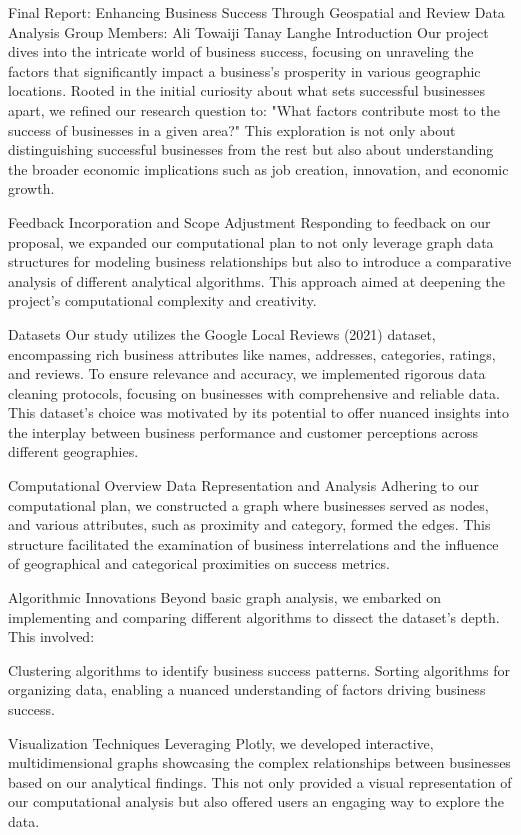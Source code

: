 Final Report: Enhancing Business Success Through Geospatial and Review Data Analysis
Group Members:
Ali Towaiji
Tanay Langhe
Introduction
Our project dives into the intricate world of business success, focusing on unraveling the factors that significantly
impact a business's prosperity in various geographic locations. Rooted in the initial curiosity about what sets
successful businesses apart, we refined our research question to: "What factors contribute most to the success of
businesses in a given area?" This exploration is not only about distinguishing successful businesses from the rest but
also about understanding the broader economic implications such as job creation, innovation, and economic growth.

Feedback Incorporation and Scope Adjustment
Responding to feedback on our proposal, we expanded our computational plan to not only leverage graph data structures
for modeling business relationships but also to introduce a comparative analysis of different analytical algorithms.
This approach aimed at deepening the project's computational complexity and creativity.

Datasets
Our study utilizes the Google Local Reviews (2021) dataset, encompassing rich business attributes like names,
addresses, categories, ratings, and reviews. To ensure relevance and accuracy, we implemented rigorous data cleaning
protocols, focusing on businesses with comprehensive and reliable data. This dataset's choice was motivated by its
potential to offer nuanced insights into the interplay between business performance and customer perceptions across
different geographies.

Computational Overview
Data Representation and Analysis
Adhering to our computational plan, we constructed a graph where businesses served as nodes, and various attributes,
such as proximity and category, formed the edges. This structure facilitated the examination of business interrelations
and the influence of geographical and categorical proximities on success metrics.

Algorithmic Innovations
Beyond basic graph analysis, we embarked on implementing and comparing different algorithms to dissect the dataset's
depth. This involved:

Clustering algorithms to identify business success patterns.
Sorting algorithms for organizing data, enabling a nuanced understanding of factors driving business success.

Visualization Techniques
Leveraging Plotly, we developed interactive, multidimensional graphs showcasing the complex relationships between
businesses based on our analytical findings. This not only provided a visual representation of our computational
analysis but also offered users an engaging way to explore the data.

